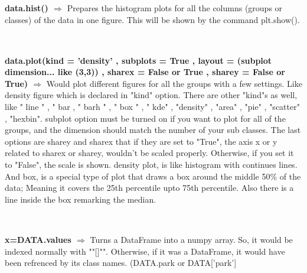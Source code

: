 \documentclass[a4paper,18pt]{article}
\begin{document}

\subsection{\colorbox {matgreen}{\color{white}{\large data.hist()}}}
\textbf{data.hist() $\Rightarrow$} Prepares the histogram plots for all the columns (groups or classes) of the data in one figure. This will be shown by the command plt.show().\\\\


\subsection{\colorbox {matgreen}{\color{white}{\large data.plot(Options)}}}
\textbf{data.plot(kind = 'density' , subplots = True , layout = (subplot dimension... like (3,3)) , sharex = False or True , sharey = False or True) $\Rightarrow$} Would plot different figures for all the groups with a few settings. Like density figure which is declared in "kind" option. There are other "kind"s as well, like " line " , " bar  , " barh " , " box " , " kde" , "density" , "area" , "pie" , "scatter" , "hexbin". subplot option must be turned on if you want to plot for all of the groups, and the dimension should match the number of your sub classes. The last options are sharey and sharex that if they are set to "True", the axis x or y related to sharex or sharey, wouldn't be scaled properly. Otherwise, if you set it to "False", the scale is shown. 
density plot, is like histogram with continues lines. And box, is a special type of plot that draws a box around the middle 50\% of the data; Meaning it covers the 25th percentile upto 75th percentile. Also there is a line inside the box remarking the median.\\\\


\subsection{\colorbox {matgreen}{\color{white}{\large DATA.values}}}
\textbf{x=DATA.values $\Rightarrow$} Turns a DataFrame into a numpy array. So, it would be indexed normally with ""[]"". Otherwise, if it was a DataFrame, it would have been refrenced by its class names. (DATA.park or DATA['park'] \\\\
\end{document}
